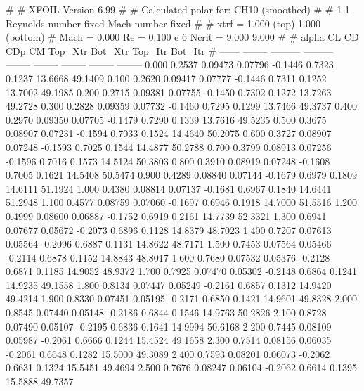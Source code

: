 #  
#       XFOIL         Version 6.99
#  
# Calculated polar for: CH10 (smoothed)                                 
#  
# 1 1 Reynolds number fixed          Mach number fixed         
#  
# xtrf =   1.000 (top)        1.000 (bottom)  
# Mach =   0.000     Re =     0.100 e 6     Ncrit =   9.000  9.000
#  
#   alpha    CL        CD       CDp       CM     Top_Xtr  Bot_Xtr  Top_Itr  Bot_Itr
#  ------ -------- --------- --------- -------- -------- -------- -------- --------
   0.000   0.2537   0.09473   0.07796  -0.1446   0.7323   0.1237  13.6668  49.1409
   0.100   0.2620   0.09417   0.07777  -0.1446   0.7311   0.1252  13.7002  49.1985
   0.200   0.2715   0.09381   0.07755  -0.1450   0.7302   0.1272  13.7263  49.2728
   0.300   0.2828   0.09359   0.07732  -0.1460   0.7295   0.1299  13.7466  49.3737
   0.400   0.2970   0.09350   0.07705  -0.1479   0.7290   0.1339  13.7616  49.5235
   0.500   0.3675   0.08907   0.07231  -0.1594   0.7033   0.1524  14.4640  50.2075
   0.600   0.3727   0.08907   0.07248  -0.1593   0.7025   0.1544  14.4877  50.2788
   0.700   0.3799   0.08913   0.07256  -0.1596   0.7016   0.1573  14.5124  50.3803
   0.800   0.3910   0.08919   0.07248  -0.1608   0.7005   0.1621  14.5408  50.5474
   0.900   0.4289   0.08840   0.07144  -0.1679   0.6979   0.1809  14.6111  51.1924
   1.000   0.4380   0.08814   0.07137  -0.1681   0.6967   0.1840  14.6441  51.2948
   1.100   0.4577   0.08759   0.07060  -0.1697   0.6946   0.1918  14.7000  51.5516
   1.200   0.4999   0.08600   0.06887  -0.1752   0.6919   0.2161  14.7739  52.3321
   1.300   0.6941   0.07677   0.05672  -0.2073   0.6896   0.1128  14.8379  48.7023
   1.400   0.7207   0.07613   0.05564  -0.2096   0.6887   0.1131  14.8622  48.7171
   1.500   0.7453   0.07564   0.05466  -0.2114   0.6878   0.1152  14.8843  48.8017
   1.600   0.7680   0.07532   0.05376  -0.2128   0.6871   0.1185  14.9052  48.9372
   1.700   0.7925   0.07470   0.05302  -0.2148   0.6864   0.1241  14.9235  49.1558
   1.800   0.8134   0.07447   0.05249  -0.2161   0.6857   0.1312  14.9420  49.4214
   1.900   0.8330   0.07451   0.05195  -0.2171   0.6850   0.1421  14.9601  49.8328
   2.000   0.8545   0.07440   0.05148  -0.2186   0.6844   0.1546  14.9763  50.2826
   2.100   0.8728   0.07490   0.05107  -0.2195   0.6836   0.1641  14.9994  50.6168
   2.200   0.7445   0.08109   0.05987  -0.2061   0.6666   0.1244  15.4524  49.1658
   2.300   0.7514   0.08156   0.06035  -0.2061   0.6648   0.1282  15.5000  49.3089
   2.400   0.7593   0.08201   0.06073  -0.2062   0.6631   0.1324  15.5451  49.4694
   2.500   0.7676   0.08247   0.06104  -0.2062   0.6614   0.1395  15.5888  49.7357
